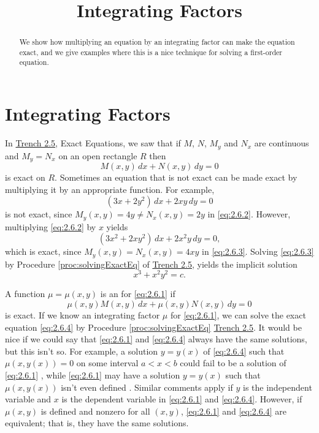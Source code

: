 \documentclass{ximera}
\title{Integrating Factors}
\begin{document}
\begin{abstract}
We show how multiplying an equation by an integrating factor can make the equation exact, and we give examples where this is a nice technique for solving a first-order equation.
\end{abstract}

\maketitle



\section*{Integrating Factors}
In \href{https://ximera.osu.edu/ode/main/exactEquations/exactEquations}{Trench 2.5}, Exact Equations, we saw that if $M$, $N$, $M_y$ and $N_x$ are
continuous and $M_y=N_x$ on an open rectangle $R$ then
\begin{equation} \label{eq:2.6.1}
M(x,y)\,dx+N(x,y)\,dy=0
\end{equation}
is exact on $R$. Sometimes an equation that is not exact can be made exact by multiplying it by an appropriate function. For example,
\begin{equation}\label{eq:2.6.2}
(3x+2y^2)\,dx+2xy\,dy=0
\end{equation}
is  not exact, since
$M_y(x,y)=4y\neq  N_x(x,y)=2y$ in \eqref{eq:2.6.2}.
 However, multiplying \eqref{eq:2.6.2}  by $x$ yields
\begin{equation}\label{eq:2.6.3}
(3x^2+2xy^2)\,dx+2x^2y\,dy=0,
\end{equation}
which is exact, since
$M_y(x,y)=N_x(x,y)=4xy$ in \eqref{eq:2.6.3}.
Solving \eqref{eq:2.6.3} by Procedure \ref{proc:solvingExactEq} of \href{https://ximera.osu.edu/ode/main/exactEquations/exactEquations}{Trench 2.5},
 yields the implicit solution
$$
x^3+x^2y^2=c.
$$

A function $\mu=\mu(x,y)$ is  an  for
\eqref{eq:2.6.1}  if
\begin{equation}\label{eq:2.6.4}
 \mu(x,y)M (x,y)\,dx+\mu(x,y)N (x,y)\,dy=0
 \end{equation}
 is exact. If we know an integrating
factor $\mu$ for \eqref{eq:2.6.1}, we can solve the exact equation
\eqref{eq:2.6.4} by Procedure \ref{proc:solvingExactEq} \href{https://ximera.osu.edu/ode/main/exactEquations/exactEquations}{Trench 2.5}. It would be
nice
if we could say that \eqref{eq:2.6.1} and \eqref{eq:2.6.4} always have the
same solutions, but this isn't so. For example, a solution
$y=y(x)$ of \eqref{eq:2.6.4} such that $\mu(x,y(x))=0$ on some interval
$a<x<b$ could fail to be a solution of \eqref{eq:2.6.1}
, while
\eqref{eq:2.6.1} may have a solution $y=y(x)$ such that $\mu(x,y(x)) $
isn't even defined 
. Similar comments
apply if $y$ is the independent variable and $x$ is the dependent
variable  in \eqref{eq:2.6.1} and \eqref{eq:2.6.4}.  However, if $\mu(x,y)$
is defined and nonzero for all $(x,y)$,  \eqref{eq:2.6.1}  and
\eqref{eq:2.6.4} are equivalent; that is, they have the same solutions.
\end{document}
